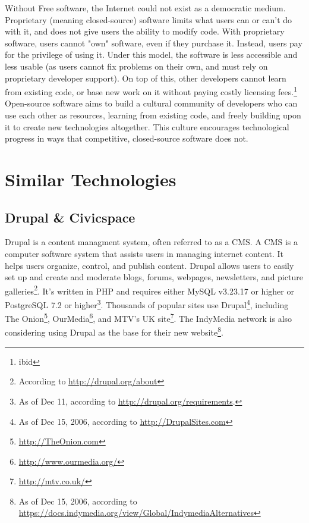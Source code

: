 \documentclass[a4paper,12pt]{report}
\begin{document}
    Without Free software, the Internet could not exist as a democratic medium.
Proprietary (meaning closed-source) software limits what users can or can't do with it, and does not give users the ability to modify code.
With proprietary software, users cannot "own" software, even if they purchase it.
Instead, users pay for the privilege of using it.
Under this model, the software is less accessible and less usable (as users cannot fix problems on their own, and must rely on proprietary developer support).
On top of this, other developers cannot learn from existing code, or base new work on it without paying costly licensing fees.\footnote{ibid} 
    Open-source software aims to build a cultural community of developers who can use each other as resources, learning from existing code, and freely building upon it to create new technologies altogether.
This culture encourages technological progress in ways that competitive, closed-source software does not. 

\section {Similar Technologies}

\subsection {Drupal & Civicspace}
Drupal is a content managment system, often referred to as a CMS. 
A CMS is a computer software system that assists users in managing internet content.
It helps users organize, control, and publish content.
Drupal allows users to easily set up and create and moderate blogs, forums, webpages, newsletters, and picture galleries\footnote{According to \url{ http://drupal.org/about}}.
It's written in PHP and requires either MySQL v3.23.17 or higher or PostgreSQL 7.2 or higher\footnote{As of Dec 11, according to \url{ http://drupal.org/requirements}.}.
Thousands of popular sites use Drupal\footnote{As of Dec 15, 2006, according to \url{http://DrupalSites.com}}, including The Onion\footnote{\url{ http://TheOnion.com}}, OurMedia\footnote{\url{http://www.ourmedia.org/}}, and MTV's UK site\footnote{\url{http://mtv.co.uk/} }.
The IndyMedia network is also considering using Drupal as the base for their new website\footnote{As of Dec 15, 2006, according to \url{https://docs.indymedia.org/view/Global/IndymediaAlternatives} }.
\end{document}
